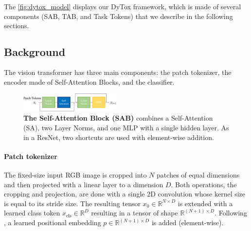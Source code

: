 The \autoref{fig:dytox_model} displays our DyTox framework, which is made of several components
(SAB, TAB, and Task Tokens) that we describe in the following sections.

\subsection{Background}
\label{sec:dytox_vit}

The vision transformer \cite{dosovitskiy2020vit} has three main components: the patch tokenizer, the
encoder made of Self-Attention Blocks, and the classifier.

\begin{figure}
    \centering
    \includegraphics[width=0.45\textwidth]{images/dytox/sab.pdf}
    \caption{\textbf{The Self-Attention Block (SAB)} combines a Self-Attention (SA), two Layer
        Norms, and one MLP with a single hidden layer. As in a ResNet, two shortcuts are used with
        element-wise addition.\vspace{-2em}}
    \label{fig:dytox_sab}
\end{figure}

\paragraph{Patch tokenizer}The fixed-size input RGB image is cropped into $N$ patches of equal
dimensions and then projected with a linear layer to a dimension $D$. Both operations, the cropping
and projection, are done with a single 2D convolution whose kernel size is equal to its stride size.
The resulting tensor $x_0 \in \mathbb{R}^{N \times D}$ is extended with a learned class token
$x_{\text{cls}} \in \mathbb{R}^D$ resulting in a tensor of shape $\mathbb{R}^{(N+1) \times D}$.
Following \cite{gehring2017posembeddings}, a learned positional embedding $p \in \mathbb{R}^{(N+1)
        \times D}$ is added (element-wise).



